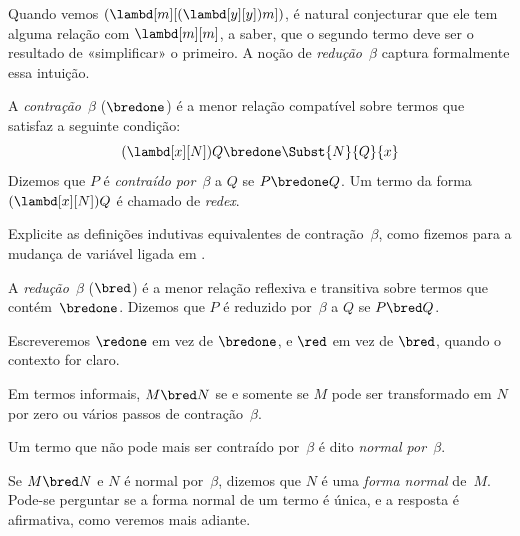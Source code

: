 \documentclass[../../../include/open-logic-section]{subfiles}
\begin{document}

Quando vemos $(\lambd[m][(\lambd[y][y]) m])$, é natural conjecturar que ele
tem alguma relação com $\lambd[m][m]$, a saber, que o segundo termo deve ser o
resultado de «simplificar» o primeiro. A noção de \emph{redução~$\beta$}
captura formalmente essa intuição.

\begin{defn} 
  A \emph{contração~$\beta$} ($\bredone$) é a menor relação compatível sobre
  termos que satisfaz a seguinte condição:
  \[
    (\lambd[x][N])Q \bredone \Subst{N}{Q}{x} 
  \]
  Dizemos que $P$ é \emph{contraído por~$\beta$} a $Q$ se $P \bredone Q$. Um
  termo da forma $(\lambd[x][N])Q$ é chamado de \emph{redex}.
\end{defn}

\begin{prob} 
  Explicite as definições indutivas equivalentes de contração~$\beta$, como
  fizemos para a mudança de variável ligada em
  .
\end{prob}
  
\begin{defn} 
  A \emph{redução~$\beta$} ($\bred$) é a menor relação reflexiva e transitiva
  sobre termos que contém~$\bredone$. Dizemos que $P$ é reduzido por~$\beta$
  a $Q$ se $P \bred Q$.
\end{defn}

Escreveremos $\redone$ em vez de $\bredone$, e $\red$ em vez de $\bred$,
quando o contexto for claro.

Em termos informais, $M \bred N$ se e somente se $M$ pode ser transformado em
$N$ por zero ou vários passos de contração~$\beta$.

\begin{defn}
Um termo que não pode mais ser contraído por~$\beta$ é dito
\emph{normal por~$\beta$}.
\end{defn}

Se $M \bred N$ e $N$ é normal por~$\beta$, dizemos que $N$ é uma
\emph{forma normal} de~$M$. Pode-se perguntar se a forma normal de um termo é
única, e a resposta é afirmativa, como veremos mais adiante.
\end{document}
